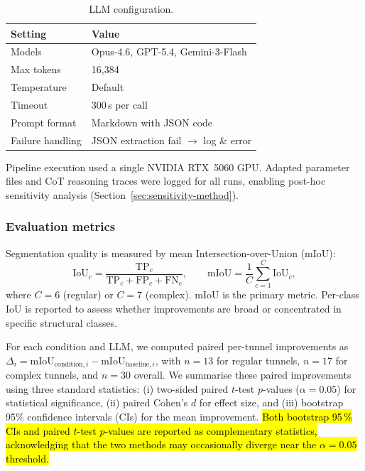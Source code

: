\documentclass[a4paper,fleqn]{cas-dc}
\begin{document}
{\begin{table}[ht]
\caption{LLM configuration.}\label{tab:llm-config}
\begin{tabular*}{\tblwidth}{@{} l l @{}}
\toprule
Setting & Value \\
\midrule
Models & Opus-4.6, GPT-5.4, Gemini-3-Flash \\
Max tokens & 16{,}384 \\
Temperature & Default \\
Timeout & 300\,s per call \\
Prompt format & Markdown with JSON code \\
Failure handling & JSON extraction fail $\rightarrow$ log \& error \\
\bottomrule
\end{tabular*}
\end{table}

Pipeline execution used a single NVIDIA RTX~5060 GPU. Adapted parameter files and CoT reasoning traces were logged for all runs, enabling post-hoc sensitivity analysis (Section~\ref{sec:sensitivity-method}).

\subsubsection{Evaluation metrics}\label{sec:metrics}

Segmentation quality is measured by mean Intersection-over-Union (mIoU):
\begin{equation}
\text{IoU}_c = \frac{\text{TP}_c}{\text{TP}_c + \text{FP}_c + \text{FN}_c}, \qquad
\text{mIoU} = \frac{1}{C} \sum_{c=1}^{C} \text{IoU}_c,
\end{equation}
where $C = 6$ (regular) or $C = 7$ (complex). mIoU is the primary metric. Per-class IoU is reported to assess whether improvements are broad or concentrated in specific structural classes.

For each condition and LLM, we computed paired per-tunnel improvements as $\Delta_i = \mathrm{mIoU}_{\text{condition},i} - \mathrm{mIoU}_{\text{baseline},i}$, with $n=13$ for regular tunnels, $n=17$ for complex tunnels, and $n=30$ overall. We summarise these paired improvements using three standard statistics: (i) two-sided paired $t$-test $p$-values ($\alpha = 0.05$) for statistical significance, (ii) paired Cohen's $d$ for effect size, and (iii) bootstrap 95\% confidence intervals (CIs) for the mean improvement. \hl{Both bootstrap 95\,\% CIs and paired $t$-test $p$-values are reported as complementary statistics, acknowledging that the two methods may occasionally diverge near the $\alpha = 0.05$ threshold.}

}
\end{document}
